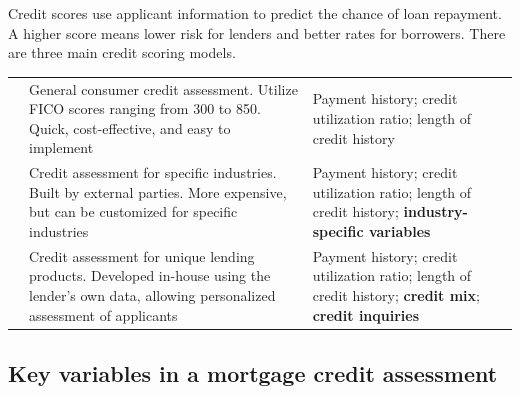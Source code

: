 
Credit scores use applicant information to predict the chance of loan repayment.
A higher score means lower risk for lenders and better rates for borrowers. There
are three main credit scoring models.

\begin{center}
\footnotesize
\begin{tabular}{L{2.5cm} L{5.2cm} L{6.8cm}}
\toprule
{} &  &  \\
\midrule
{} & General consumer credit assessment. Utilize FICO
  scores ranging from 300 to 850. Quick, cost-effective, and easy to implement &
  Payment history; credit utilization ratio; length of credit history \\
 & Credit assessment for specific industries. Built by
  external parties. More expensive, but can be customized for specific industries &
  Payment history; credit utilization ratio; length of credit history;
  \textbf{industry-specific variables} \\
 & Credit assessment for unique lending products. Developed
  in-house using the lender's own data, allowing personalized assessment of
  applicants &
  Payment history; credit utilization ratio; length of credit history;
  \textbf{credit mix}; \textbf{credit inquiries} \\
\bottomrule
\end{tabular}
\end{center}


\subsection*{Key variables in a mortgage credit assessment}

